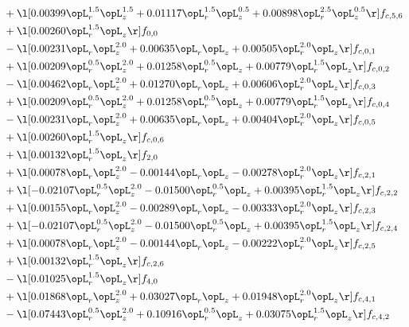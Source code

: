 \begin{alignat}{2}
& + \l[  0.00399 \opL_r^{1.5} \opL_z^{1.5} +  0.01117 \opL_r^{1.5} \opL_z^{0.5} +  0.00898 \opL_r^{2.5} \opL_z^{0.5}  \r] f_{c,5,6} \nonumber \\ 
& + \l[  0.00260 \opL_r^{1.5} \opL_z  \r] f_{0,0} \nonumber \\ 
& - \l[  0.00231 \opL_r \opL_z^{2.0} +  0.00635 \opL_r \opL_z +  0.00505 \opL_r^{2.0} \opL_z  \r] f_{c,0,1} \nonumber \\ 
& + \l[  0.00209 \opL_r^{0.5} \opL_z^{2.0} +  0.01258 \opL_r^{0.5} \opL_z +  0.00779 \opL_r^{1.5} \opL_z  \r] f_{c,0,2} \nonumber \\ 
& - \l[  0.00462 \opL_r \opL_z^{2.0} +  0.01270 \opL_r \opL_z +  0.00606 \opL_r^{2.0} \opL_z  \r] f_{c,0,3} \nonumber \\ 
& + \l[  0.00209 \opL_r^{0.5} \opL_z^{2.0} +  0.01258 \opL_r^{0.5} \opL_z +  0.00779 \opL_r^{1.5} \opL_z  \r] f_{c,0,4} \nonumber \\ 
& - \l[  0.00231 \opL_r \opL_z^{2.0} +  0.00635 \opL_r \opL_z +  0.00404 \opL_r^{2.0} \opL_z  \r] f_{c,0,5} \nonumber \\ 
& + \l[  0.00260 \opL_r^{1.5} \opL_z  \r] f_{c,0,6} \nonumber \\ 
& + \l[  0.00132 \opL_r^{1.5} \opL_z  \r] f_{2,0} \nonumber \\ 
& + \l[  0.00078 \opL_r \opL_z^{2.0}   -0.00144 \opL_r \opL_z   -0.00278 \opL_r^{2.0} \opL_z  \r] f_{c,2,1} \nonumber \\ 
& + \l[  -0.02107 \opL_r^{0.5} \opL_z^{2.0}   -0.01500 \opL_r^{0.5} \opL_z +  0.00395 \opL_r^{1.5} \opL_z  \r] f_{c,2,2} \nonumber \\ 
& + \l[  0.00155 \opL_r \opL_z^{2.0}   -0.00289 \opL_r \opL_z   -0.00333 \opL_r^{2.0} \opL_z  \r] f_{c,2,3} \nonumber \\ 
& + \l[  -0.02107 \opL_r^{0.5} \opL_z^{2.0}   -0.01500 \opL_r^{0.5} \opL_z +  0.00395 \opL_r^{1.5} \opL_z  \r] f_{c,2,4} \nonumber \\ 
& + \l[  0.00078 \opL_r \opL_z^{2.0}   -0.00144 \opL_r \opL_z   -0.00222 \opL_r^{2.0} \opL_z  \r] f_{c,2,5} \nonumber \\ 
& + \l[  0.00132 \opL_r^{1.5} \opL_z  \r] f_{c,2,6} \nonumber \\ 
& - \l[  0.01025 \opL_r^{1.5} \opL_z  \r] f_{4,0} \nonumber \\ 
& + \l[  0.01868 \opL_r \opL_z^{2.0} +  0.03027 \opL_r \opL_z +  0.01948 \opL_r^{2.0} \opL_z  \r] f_{c,4,1} \nonumber \\ 
& - \l[  0.07443 \opL_r^{0.5} \opL_z^{2.0} +  0.10916 \opL_r^{0.5} \opL_z +  0.03075 \opL_r^{1.5} \opL_z  \r] f_{c,4,2} \nonumber \\ 

\end{alignat}
